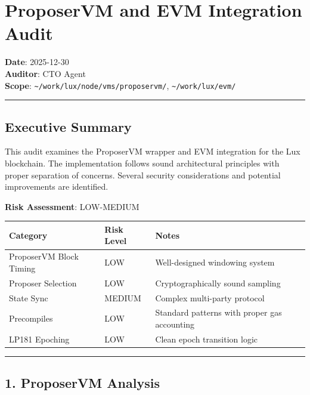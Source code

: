\documentclass[
]{article}
\author{}
\date{}
\newcounter{none} %
\begin{document}
\section{ProposerVM and EVM Integration
Audit}\label{proposervm-and-evm-integration-audit}

\textbf{Date}: 2025-12-30\\
\textbf{Auditor}: CTO Agent\\
\textbf{Scope}:
\texttt{\textasciitilde{}/work/lux/node/vms/proposervm/},
\texttt{\textasciitilde{}/work/lux/evm/}

\begin{center}\rule{0.5\linewidth}{0.5pt}\end{center}

\subsection{Executive Summary}\label{executive-summary}

This audit examines the ProposerVM wrapper and EVM integration for the
Lux blockchain. The implementation follows sound architectural
principles with proper separation of concerns. Several security
considerations and potential improvements are identified.

\textbf{Risk Assessment}: LOW-MEDIUM

{\def\LTcaptype{none} %
\begin{longtable}[]{@{}lll@{}}
\toprule\noalign{}
Category & Risk Level & Notes \\
\midrule\noalign{}
\endhead
\bottomrule\noalign{}
\endlastfoot
ProposerVM Block Timing & LOW & Well-designed windowing system \\
Proposer Selection & LOW & Cryptographically sound sampling \\
State Sync & MEDIUM & Complex multi-party protocol \\
Precompiles & LOW & Standard patterns with proper gas accounting \\
LP181 Epoching & LOW & Clean epoch transition logic \\
\end{longtable}
}

\begin{center}\rule{0.5\linewidth}{0.5pt}\end{center}

\subsection{1. ProposerVM Analysis}\label{1-proposervm-analysis}
\end{document}
